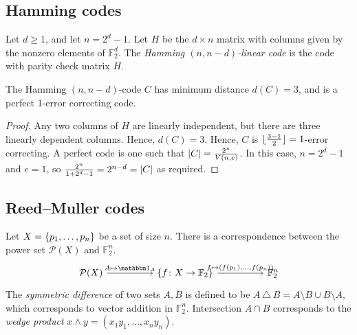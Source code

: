 \subsection{Hamming codes}
\begin{definition}
    Let \( d \geq 1 \), and let \( n = 2^d - 1 \).
    Let \( H \) be the \( d \times n \) matrix with columns given by the nonzero elements of \( \mathbb F_2^d \).
    The \emph{Hamming \( (n, n-d) \)-linear code} is the code with parity check matrix \( H \).
\end{definition}
\begin{lemma}
    The Hamming \( (n, n-d) \)-code \( C \) has minimum distance \( d(C) = 3 \), and is a perfect 1-error correcting code.
\end{lemma}
\begin{proof}
    Any two columns of \( H \) are linearly independent, but there are three linearly dependent columns.
    Hence, \( d(C) = 3 \).
    Hence, \( C \) is \( \lfloor\frac{3-1}{2}\rfloor = 1 \)-error correcting.
    A perfect code is one such that \( \abs{C} = \frac{2^n}{V(n,e)} \).
    In this case, \( n = 2^d - 1 \) and \( e = 1 \), so \( \frac{2^n}{1 + 2^d - 1} = 2^{n-d} = \abs{C} \) as required.
\end{proof}

\subsection{Reed--Muller codes}
Let \( X = \qty{p_1, \dots, p_n} \) be a set of size \( n \).
There is a correspondence between the power set \( \mathcal P(X) \) and \( \mathbb F_2^n \).
\[\begin{tikzcd}[column sep=huge]
	{\mathcal P(X)} & {\qty{f \colon X \to \mathbb F_2}} & {\mathbb F_2^n}
	\arrow["{A \mapsto \mathbbm 1_A}", from=1-1, to=1-2]
	\arrow["{f \mapsto (f(p_1), \dots, f(p_n))}", from=1-2, to=1-3]
\end{tikzcd}\]
The \emph{symmetric difference} of two sets \( A, B \) is defined to be \( A \,\triangle\, B = A\setminus B \cup B \setminus A \), which corresponds to vector addition in \( \mathbb F_2^n \). 
Intersection \( A \cap B \) corresponds to the \emph{wedge product} \( x \wedge y = (x_1 y_1, \dots, x_n y_n) \).

